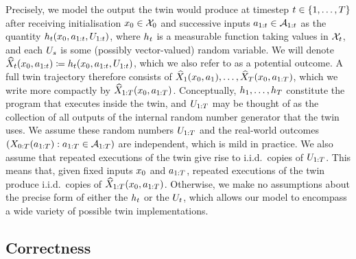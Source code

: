 Precisely, we model the output the twin would produce at timestep $t \in \{1, \ldots, T\}$ after receiving initialisation $x_0 \in \mathcal{X}_0$ and successive inputs $a_{1:t} \in \mathcal{A}_{1:t}$ as the quantity $h_t(x_0, a_{1:t}, U_{1:t})$, where $h_t$ is a measurable function taking values in $\mathcal{X}_{t}$, and each $U_s$ is some (possibly vector-valued) random variable.
We will denote $\widehat{X}_{t}(x_0, a_{1:t}) \coloneqq h_t(x_0, a_{1:t}, U_{1:t})$, which we also refer to as a potential outcome.
A full twin trajectory therefore consists of $\widehat{X}_1(x_0, a_1), \ldots, \widehat{X}_T(x_0, a_{1:T})$, which we write more compactly by $\widehat{X}_{1:T}(x_0, a_{1:T})$.
Conceptually, $h_1, \ldots, h_T$ constitute the program that executes inside the twin, and $U_{1:T}$ may be thought of as the collection of all outputs of the internal random number generator that the twin uses.
We assume these random numbers $U_{1:T}$ and the real-world outcomes $(X_{0:T}(a_{1:T}) : a_{1:T} \in \mathcal{A}_{1:T})$ are independent, which is mild in practice.
We also assume that repeated executions of the twin give rise to i.i.d.\ copies of $U_{1:T}$.
This means that, given fixed inputs $x_0$ and $a_{1:T}$, repeated executions of the twin produce i.i.d.\ copies of $\widehat{X}_{1:T}(x_0, a_{1:T})$.
Otherwise, we make no assumptions about the precise form of either the $h_t$ or the $U_t$, which allows our model to encompass a wide variety of possible twin implementations.


\subsection{Correctness}

